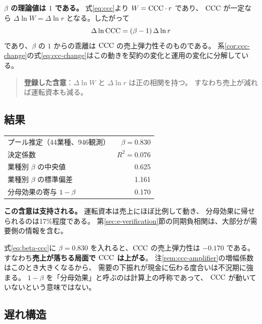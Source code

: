 \textbf{$\beta$ の理論値は $1$ である。}
式\eqref{eq:ccc}より $W=\mathrm{CCC}\cdot r$ であり、
$\mathrm{CCC}$ が一定なら $\Delta\ln W=\Delta\ln r$ となる。したがって
\begin{equation}
\Delta\ln\mathrm{CCC} = (\beta-1)\,\Delta\ln r
\label{eq:beta-ccc}
\end{equation}
であり、$\beta$ の $1$ からの乖離は $\mathrm{CCC}$ の売上弾力性そのものである。
系\ref{cor:ccc-change}の式\eqref{eq:ccc-change}はこの動きを契約の変化と運用の変化に分解している。

\begin{quote}
\textbf{登録した含意}：$\Delta\ln W$ と $\Delta\ln r$ は正の相関を持つ。
すなわち売上が減れば運転資本も減る。
\end{quote}

\subsection{結果}

\begin{center}
\begin{tabularx}{\textwidth}{@{}Xr@{}}
\toprule
プール推定（44業種、946観測） & $\beta = 0.830$ \\
決定係数 & $R^2 = 0.076$ \\
業種別 $\beta$ の中央値 & 0.625 \\
業種別 $\beta$ の標準偏差 & 1.161 \\
\midrule
分母効果の寄与 $1-\beta$ & 0.170 \\
\bottomrule
\end{tabularx}
\label{tab:wc-elasticity-result}
\end{center}

\textbf{この含意は支持される。} 運転資本は売上にほぼ比例して動き、
分母効果に帰せられるのは17\%程度である。
第\ref{sec:e-verification}節の同期負相関は、大部分が需要側の情報を含む。

式\eqref{eq:beta-ccc}に $\beta=0.830$ を入れると、$\mathrm{CCC}$ の売上弾力性は $-0.170$ である。
すなわち\textbf{売上が落ちる局面で $\mathrm{CCC}$ は上がる}。
注\ref{rem:ccc-amplifier}の増幅係数はこのとき大きくなるから、
需要の下振れが現金に伝わる度合いは不況期に強まる。
$1-\beta$ を「分母効果」と呼ぶのは計算上の呼称であって、
$\mathrm{CCC}$ が動いていないという意味ではない。

\subsection{遅れ構造}
\label{sec:lag-test}

